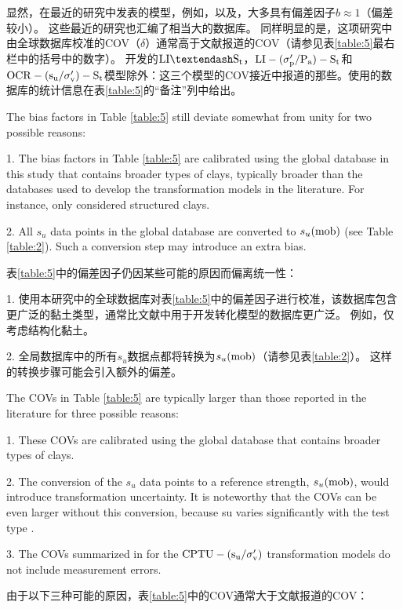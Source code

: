 \begin{paracol}{2}
\begin{Parallel}{0.60\textwidth}{}
{    }
    \ParallelRText
    {
        显然，在最近的研究中发表的模型，例如\citet{Kulhawy1990}，\citet{Chen1996488}以及\citet{Ching201252, Ching2012522}，大多具有偏差因子$b\approx{}1$（偏差较小）。 这些最近的研究也汇编了相当大的数据库。 同样明显的是，这项研究中由全球数据库校准的COV（$\delta$）通常高于文献报道的COV（请参见表\ref{table:5}最右栏中的括号中的数字）。 \citet{Ching2012522}开发的$\rm{LI}–S_t$，$\rm{LI}-(\sigma_p'/P_a)-S_t$和$\rm{OCR}-(s_u/\sigma_v')-S_t$模型除外：这三个模型的COV接近\citet{Ching2012522}中报道的那些。\citet{Ching2012522}使用的数据库的统计信息在表\ref{table:5}的“备注”列中给出。
    }
    \ParallelPar
    \ParallelLText
    {
        The bias factors in Table \ref{table:5} still deviate somewhat from unity for two possible reasons:

        1. The bias factors in Table \ref{table:5} are calibrated using the global database in this study that contains broader types of clays, typically broader than the databases used to develop the transformation models in the literature. For instance, \citet{Ching2012522} only considered structured clays.

        2. All $s_u$ data points in the global database are converted to $s_u(\rm{mob})$ (see Table \ref{table:2}). Such a conversion step may introduce an extra bias.
    }
    \ParallelRText
    {
        表\ref{table:5}中的偏差因子仍因某些可能的原因而偏离统一性：

        1. 使用本研究中的全球数据库对表\ref{table:5}中的偏差因子进行校准，该数据库包含更广泛的黏土类型，通常比文献中用于开发转化模型的数据库更广泛。 例如，\citet{Ching2012522}仅考虑结构化黏土。
        
        2. 全局数据库中的所有$s_u$数据点都将转换为$s_u(\rm{mob})$（请参见表\ref{table:2}）。 这样的转换步骤可能会引入额外的偏差。
    }
    \ParallelPar
    \ParallelLText
    {
        The COVs in Table \ref{table:5} are typically larger than those reported in the literature for three possible reasons:

        1. These COVs are calibrated using the global database that contains broader types of clays.

        2. The conversion of the $s_u$ data points to a reference strength, $s_u(\rm{mob})$, would introduce transformation uncertainty. It is noteworthy that the COVs can be even larger without this conversion, because su varies significantly with the test type \citep{Ladd1977421}.
        
        3. The COVs summarized in \citet{Ching201252} for the $\rm{CPTU}-(s_u/\sigma_v')$ transformation models do not include measurement errors.
    }
    \ParallelRText
    {
        由于以下三种可能的原因，表\ref{table:5}中的COV通常大于文献报道的COV：

}
\end{Parallel}
\end{paracol}
